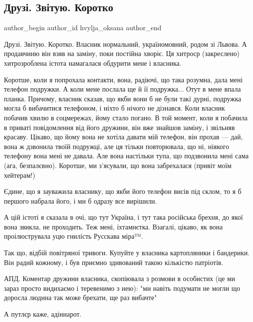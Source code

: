  
 
 
 
 
 
\subsection{Друзі. Звітую. Коротко}
\label{sec:25_07_2021.fb.hvylja_oksana.1.otchet_druzja}
 
\ifcmt
 author_begin
   author_id hvylja_oksana
 author_end
\fi

Друзі. Звітую. Коротко. Власник нормальний, україномовний, родом зі Львова. А
продавчиню він взяв на заміну, поки постійна хворіє. Ця хитроср (закреслено)
хитрозроблена істота намагалася обдурити мене і власника.

Коротше, коли я попрохала контакти, вона, радіючі, що така розумна, дала мені
телефон подружки. А коли мене послала ще й її подружка... Отут в мене впала
планка. Причому, власник сказав, що якби вони б не були такі дурні, подружка
могла б вибачитися телефоном, і ніхто б нічого не дізнався. Коли власник
побачив хвилю в соцмережах, йому стало погано. В той момент, коли я побачила в
приваті повідомлення від його дружини, він вже знайшов заміну, і звільняв
красаву. Цікаво, що йому вона не хотіла давати мій телефон, він прохав — дай,
вона ж дзвонила твоїй подружці, але ця тільки повторювала, що ні, ніякого
телефону вона мені не давала. Але вона настільки тупа, що подзвонила мені сама
(ага, безпалєвно). Коротше, ми з'ясували, що вона забрехалася (привіт моїм
хейтерам!)

Єдине, що я зауважила власнику, що якби його телефон висів під склом, то я б
першого набрала його, і ми б одразу все вирішили.

А цій істоті я сказала в очі, що тут Україна, і тут така російська брехня, до
якої вона звикла, не проходить. Теж мені, іхтамнєтка. Взагалі, цікаво, як вона
проілюструвала уцю гнилість Русскава міра™.

Так що, відбій повітряної тривоги. Купуйте у власника картопляники і бандерики.
Він радий кожному, і був приємно здивований такою кількістю патріотів.

АПД. Коментар дружини власника, скопіювала з розмови в особистих (це ми зараз
просто видихаємо і теревенимо з нею): "ми навіть подумати не могли що доросла
людина так може брехати, ще раз вибачте"

А путлєр каже, адіннарот.

